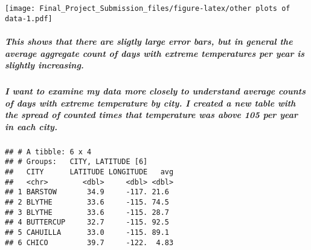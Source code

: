 \documentclass[]{article}
\newenvironment{Shaded}{\begin{snugshade}}{\end{snugshade}}
\newcommand{\DataTypeTok}[1]{\textcolor[rgb]{0.13,0.29,0.53}{#1}}
\newcommand{\DecValTok}[1]{\textcolor[rgb]{0.00,0.00,0.81}{#1}}
\newcommand{\KeywordTok}[1]{\textcolor[rgb]{0.13,0.29,0.53}{\textbf{#1}}}
\newcommand{\NormalTok}[1]{#1}
\newcommand{\OperatorTok}[1]{\textcolor[rgb]{0.81,0.36,0.00}{\textbf{#1}}}
\newcommand{\StringTok}[1]{\textcolor[rgb]{0.31,0.60,0.02}{#1}}
\let\oldsubparagraph\subparagraph
\renewcommand{\subparagraph}[1]{\oldsubparagraph{#1}\mbox{}}
\begin{document}
\texttt{[image: Final\_Project\_Submission\_files/figure-latex/other plots of data-1.pdf]}

\hypertarget{this-shows-that-there-are-sligtly-large-error-bars-but-in-general-the-average-aggregate-count-of-days-with-extreme-temperatures-per-year-is-slightly-increasing.}{%
\subparagraph{This shows that there are sligtly large error bars, but in
general the average aggregate count of days with extreme temperatures
per year is slightly
increasing.}\label{this-shows-that-there-are-sligtly-large-error-bars-but-in-general-the-average-aggregate-count-of-days-with-extreme-temperatures-per-year-is-slightly-increasing.}}

\hypertarget{i-want-to-examine-my-data-more-closely-to-understand-average-counts-of-days-with-extreme-temperature-by-city.-i-created-a-new-table-with-the-spread-of-counted-times-that-temperature-was-above-105-per-year-in-each-city.}{%
\subparagraph{I want to examine my data more closely to understand
average counts of days with extreme temperature by city. I created a new
table with the spread of counted times that temperature was above 105
per year in each
city.}\label{i-want-to-examine-my-data-more-closely-to-understand-average-counts-of-days-with-extreme-temperature-by-city.-i-created-a-new-table-with-the-spread-of-counted-times-that-temperature-was-above-105-per-year-in-each-city.}}

\begin{Shaded}
\end{Shaded}

\begin{verbatim}
## # A tibble: 6 x 4
## # Groups:   CITY, LATITUDE [6]
##   CITY      LATITUDE LONGITUDE   avg
##   <chr>        <dbl>     <dbl> <dbl>
## 1 BARSTOW       34.9     -117. 21.6 
## 2 BLYTHE        33.6     -115. 74.5 
## 3 BLYTHE        33.6     -115. 28.7 
## 4 BUTTERCUP     32.7     -115. 92.5 
## 5 CAHUILLA      33.0     -115. 89.1 
## 6 CHICO         39.7     -122.  4.83
\end{verbatim}
\end{document}
